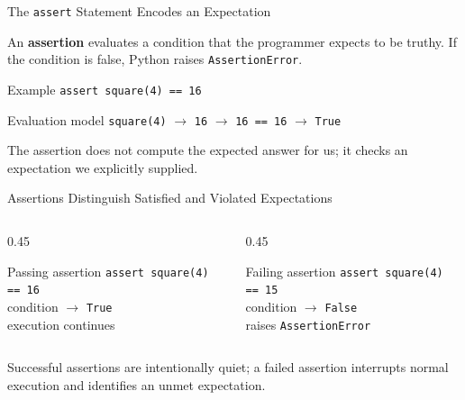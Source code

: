 \documentclass[aspectratio=169,10pt]{beamer}
\begin{document}

\begin{frame}{The \texttt{assert} Statement Encodes an Expectation}
  \begin{cpdefinition}
    An \textbf{assertion} evaluates a condition that the programmer expects to be truthy. If the condition is false, Python raises \texttt{AssertionError}.
  \end{cpdefinition}

  \begin{block}{Example}
    \texttt{assert square(4) == 16}
  \end{block}

  \begin{block}{Evaluation model}
    \centering
    \texttt{square(4)} $\rightarrow$ \texttt{16} $\rightarrow$ \texttt{16 == 16} $\rightarrow$ \texttt{True}
  \end{block}

  \begin{keyidea}
    The assertion does not compute the expected answer for us; it checks an expectation we explicitly supplied.
  \end{keyidea}
\end{frame}

\begin{frame}{Assertions Distinguish Satisfied and Violated Expectations}
  \begin{columns}[T,onlytextwidth]
    \begin{column}{0.45\textwidth}
      \begin{block}{Passing assertion}
        \texttt{assert square(4) == 16}\\[0.06in]
        condition $\rightarrow$ \texttt{True}\\
        execution continues
      \end{block}
    \end{column}
    \begin{column}{0.45\textwidth}
      \begin{block}{Failing assertion}
        \texttt{assert square(4) == 15}\\[0.06in]
        condition $\rightarrow$ \texttt{False}\\
        raises \texttt{AssertionError}
      \end{block}
    \end{column}
  \end{columns}

  \begin{keyidea}
    Successful assertions are intentionally quiet; a failed assertion interrupts normal execution and identifies an unmet expectation.
  \end{keyidea}
\end{frame}
\end{document}
